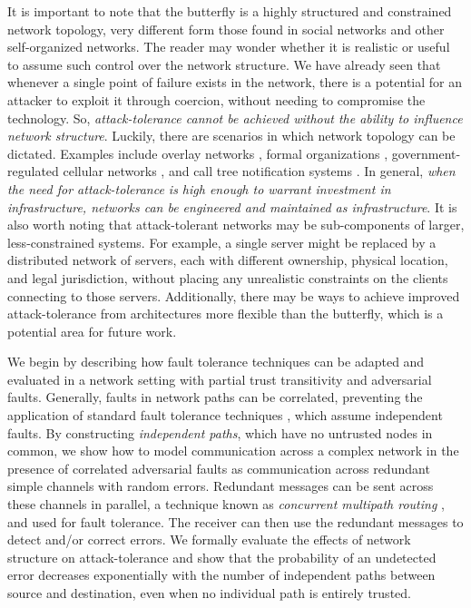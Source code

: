 \documentclass[twocolumn]{article}
\begin{document}
It is important to note that the butterfly is a highly structured and constrained
network topology,
very different form those found in social networks and other
self-organized networks.
The reader may wonder whether it is realistic or useful to assume such control over
the network structure.
We have already seen that whenever a single point of failure exists in the network,
there is a potential for an attacker to exploit it through coercion,
without needing to compromise the technology.
So, {\em attack-tolerance cannot be achieved without the ability to influence
network structure}.
Luckily, there are scenarios in which network topology can be dictated.
Examples include overlay networks
\cite{lua_survey_2005, korzun_structured_2013},
formal organizations \cite{mohr_explaining_1982},
government-regulated cellular networks \cite{walker_mass_2012},
and call tree notification systems \cite{nickerson_thinking_2010}.
In general,
{\em when the need for attack-tolerance is high enough to warrant investment
in infrastructure, networks can be engineered and maintained as infrastructure}.
It is also worth noting that attack-tolerant networks may be sub-components of
larger, less-constrained systems.
For example, a single server might be replaced by a distributed network of servers,
each with different ownership, physical location, and legal jurisdiction,
without placing any unrealistic constraints on the clients connecting to
those servers.
Additionally, there may be ways to achieve improved attack-tolerance from architectures
more flexible than the butterfly, which is a potential area for future work.

We begin by describing how fault tolerance techniques can be adapted and
evaluated in a network setting with partial trust transitivity and
adversarial faults.
Generally, faults in network paths can be correlated,
preventing the application of standard fault tolerance techniques
\cite{avizienis_basic_2004, von_neumann_probabilistic_1956},
which assume independent faults.
By constructing {\em independent paths},
which have no untrusted nodes in common,
we show how to model communication across a complex network in the presence
of correlated adversarial faults as communication across redundant
simple channels with random errors.
Redundant messages can be sent across these channels in parallel,
a technique known as {\em concurrent multipath routing}
\cite{zin_survey_2015, qadir_exploiting_2015, khiani_comparative_2013},
and used for fault tolerance.
The receiver can then use the redundant messages to detect and/or correct
errors.
We formally evaluate the
effects of network structure on attack-tolerance and show that the probability
of an undetected error decreases exponentially with the number of
independent paths between source and destination,
even when no individual path is entirely trusted.
\end{document}
